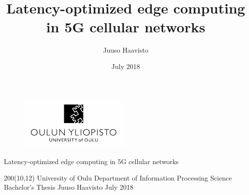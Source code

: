 \documentclass[12pt]{article}
\title{Latency-optimized edge computing in 5G cellular networks}
\author{Juuso Haavisto}
\date{July 2018}
\begin{document}
\renewcommand{\rmdefault}{phv} %
\renewcommand{\familydefault}{\rmdefault}

\begin{titlepage}


    \begin{figure}
      \centering
        \includegraphics[width=0.5\textwidth]{./assets/univ.png}
    \end{figure}


    \begin{center}
        \selectfont
        \huge{Latency-optimized edge computing in 5G cellular networks}
    \end{center}

    \begin{textblock}{200}(10,12)%
    \obeylines
    \setlength{\parskip}{0cm}
        University of Oulu
        Department of Information Processing
        Science
        Bachelor's Thesis
        Juuso Haavisto
        July 2018
    \end{textblock}%

\end{titlepage}

\newpage
\end{document}

